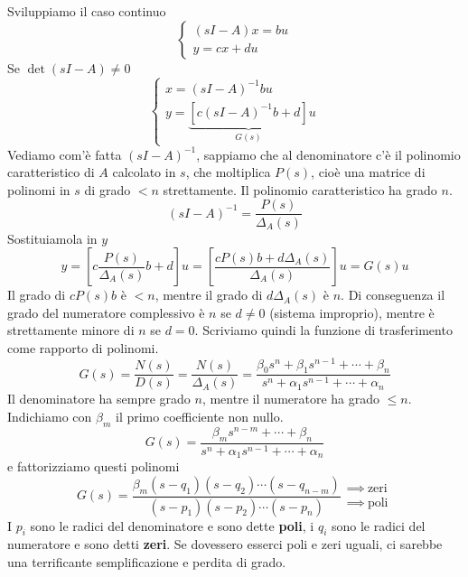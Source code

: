 Sviluppiamo il caso continuo
\begin{equation*}
	\begin{cases}
		(sI-A)x=bu \\
		y=cx+du    
	\end{cases}
\end{equation*}
Se $\det(sI-A) \neq 0$
\begin{equation*}
	\begin{cases}
		x=(sI-A)^{-1} bu                                       \\
		y=\underbrace{\left[ c(sI-A)^{-1} b+d\right]}_{G(s)} u 
	\end{cases}
\end{equation*}
Vediamo com'è fatta $(sI-A)^{-1}$, sappiamo che al denominatore c'è il polinomio caratteristico di $A$ calcolato in $s$, che moltiplica $P(s)$, cioè una matrice di polinomi in $s$ di grado $< n$ strettamente. Il polinomio caratteristico ha grado $n$.
\begin{equation*}
	(sI-A)^{-1} =\frac{P(s)}{\Delta _A(s)}
\end{equation*}
Sostituiamola in $y$
\begin{equation*}
	y=\left[ c\frac{P(s)}{\Delta _A(s)} b+d\right] u=\left[\frac{cP(s) b+d\Delta _A(s)}{\Delta _A(s)}\right] u=G(s) u
\end{equation*}
Il grado di $cP(s) b$ è $< n$, mentre il grado di $d\Delta _A(s)$ è $n$. Di conseguenza il grado del numeratore complessivo è $n$ se $d\neq 0$ (sistema improprio), mentre è strettamente minore di $n$ se $d=0$. Scriviamo quindi la funzione di trasferimento come rapporto di polinomi.
\begin{equation*}
	G(s) =\frac{N(s)}{D(s)} =\frac{N(s)}{\Delta _A(s)} =\frac{\beta _0 s^n +\beta _1 s^{n-1} +\cdots +\beta _n}{s^n +\alpha _1 s^{n-1} +\cdots +\alpha _n}
\end{equation*}
Il denominatore ha sempre grado $n$, mentre il numeratore ha grado $\leq n$. Indichiamo con $\beta _m$ il primo coefficiente non nullo.
\begin{equation*}
	G(s) =\frac{\beta _m s^{n-m} +\cdots +\beta _n}{s^n +\alpha _1 s^{n-1} +\cdots +\alpha _n}
\end{equation*}
e fattorizziamo questi polinomi
\begin{equation}
	G(s) =\frac{\beta _m(s-q_1)(s-q_2) \cdots (s-q_{n-m})}{(s-p_1)(s-p_2) \cdots (s-p_n)}\begin{array}{ l }
	\implies \ \text{zeri}\\
	\implies \ \text{poli}
	\end{array}
\end{equation}
I $p_i$ sono le radici del denominatore e sono dette \textbf{poli}, i $q_i$ sono le radici del numeratore e sono detti \textbf{zeri}. Se dovessero esserci poli e zeri uguali, ci sarebbe una terrificante semplificazione e perdita di grado.

